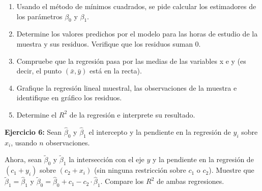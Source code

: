 \documentclass[10pt,a4paper]{article}
\begin{document}
\begin{enumerate}
    \item  Usando el método de mínimos cuadrados, se pide calcular los estimadores de los parámetros \( \beta_0 \) y \( \beta_1 \). 

     \item Determine los valores predichos por el modelo para las horas de estudio de la muestra y sus  residuos. Verifique que los residuos suman 0.

     
    \item  Compruebe que la regresión pasa por las medias de las variables x e y (es decir, el punto $(\bar{x}, \bar{y})$ está en la recta).

\item Grafique la regresión lineal muestral, las observaciones de la muestra e identifique en gráfico los residuos.

    \item  Determine el $R^2$ de la regresión e interprete su resultado. 
\end{enumerate}

{\bf Ejercicio 6:} Sean \(\hat{\beta}_0\) y \(\hat{\beta}_1\) el intercepto y la pendiente en la regresión de \(y_i\) sobre \(x_i\), usando \(n\) observaciones.

Ahora, sean \(\tilde{\beta}_0\) y \(\tilde{\beta}_1\) la intersección con el eje \(y\) y la pendiente en la regresión de \((c_1 + y_i)\) sobre \((c_2 + x_i)\) (sin ninguna restricción sobre \(c_1\) o \(c_2\)). Muestre que \(\tilde{\beta}_1 = \hat{\beta}_1\) y \(\tilde{\beta}_0 = \hat{\beta}_0 +c_1- c_2 \cdot \hat{\beta}_1\). Compare los $R^2$ de ambas regresiones.
    
\end{document}
